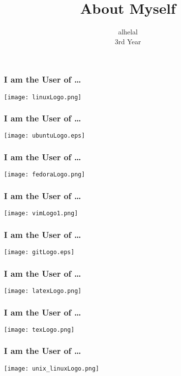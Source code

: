 \documentclass{beamer}
\begin{document}
\title{About Myself}
\author{alhelal\\3rd Year}
\maketitle
\begin{frame}
  \frametitle{I am the User of \ldots}
  \begin{center}
    \texttt{[image: linuxLogo.png]}
  \end{center}
\end{frame}
\begin{frame}
  \frametitle{I am the User of \ldots}
  \begin{center}
    \texttt{[image: ubuntuLogo.eps]}
  \end{center}
\end{frame}
\begin{frame}
  \frametitle{I am the User of \ldots}
  \begin{center}
    \texttt{[image: fedoraLogo.png]}
  \end{center}
\end{frame}
\begin{frame}
  \frametitle{I am the User of \ldots}
  \begin{center}
    \texttt{[image: vimLogo1.png]}
  \end{center}
\end{frame}
\begin{frame}
  \frametitle{I am the User of \ldots}
  \begin{center}
    \texttt{[image: gitLogo.eps]}
  \end{center}
\end{frame}
\begin{frame}
  \frametitle{I am the User of \ldots}
  \begin{center}
    \texttt{[image: latexLogo.png]}
  \end{center}
\end{frame}
\begin{frame}
  \frametitle{I am the User of \ldots}
  \begin{center}
    \texttt{[image: texLogo.png]}
  \end{center}
\end{frame}
\begin{frame}
  \frametitle{I am the User of \ldots}
  \begin{center}
    \texttt{[image: unix\_linuxLogo.png]}
  \end{center}
\end{frame}
\end{document}
